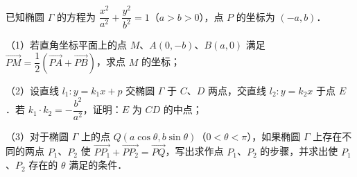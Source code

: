 \begin{question}
已知椭圆 $\Gamma$ 的方程为 $\dfrac{x^2}{a^2}+\dfrac{y^2}{b^2}=1$（$a>b>0$），点 $P$ 的坐标为 $(-a,b)$．

（1）若直角坐标平面上的点 $M$、$A(0,-b)$、$B(a,0)$ 满足 $\overrightarrow{PM}=\dfrac12\left(\overrightarrow{PA}+\overrightarrow{PB}\right)$，求点 $M$ 的坐标；

（2）设直线 $l_1:y=k_1x+p$ 交椭圆 $\Gamma$ 于 $C$、$D$ 两点，交直线 $l_2:y=k_2x$ 于点 $E$．若 $k_1\cdot k_2=-\dfrac{b^2}{a^2}$，证明：$E$ 为 $CD$ 的中点；

（3）对于椭圆 $\Gamma$ 上的点 $Q(a\cos\theta,b\sin\theta)$（$0<\theta<\pi$），如果椭圆 $\Gamma$ 上存在不同的两点 $P_1$、$P_2$ 使 $\overrightarrow{PP_1}+\overrightarrow{PP_2}=\overrightarrow{PQ}$，写出求作点 $P_1$、$P_2$ 的步骤，并求出使 $P_1$、$P_2$ 存在的 $\theta$ 满足的条件．
\nopagebreak[4]
\begin{center}\end{center}
\nopagebreak[4]

\end{question}
\endgroup